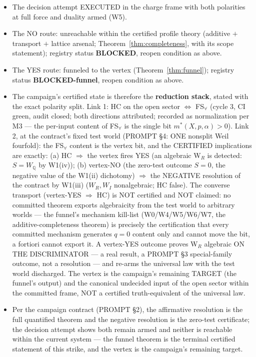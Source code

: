 \documentclass[11pt]{article}
\theoremstyle{definition}
\newcommand{\Q}{\mathbb{Q}}
\begin{document}
\begin{itemize}
\item The decision attempt EXECUTED in the charge frame with both polarities
at full force and duality armed (W5).
\item The NO route: unreachable within the certified profile theory
(additive $+$ transport $+$ lattice arsenal;
Theorem~\ref{thm:completeness}, with its scope statement); registry status
\textbf{BLOCKED}, reopen condition as above.
\item The YES route: funneled to the vertex (Theorem~\ref{thm:funnel}); registry
status \textbf{BLOCKED-funnel}, reopen condition as above.
\item The campaign's certified state is therefore the \textbf{reduction
stack}, stated with the exact polarity split. Link 1:
HC on the open sector $\iff$ FS$_\forall$ (cycle 3, CI green, audit
closed; both directions attributed; recorded as normalization per M3 ---
the per-input content of FS$_\forall$ is the single bit
$m^*(X,p,\alpha) > 0$). Link 2, at the contract's fixed test world
(PROMPT \S4: ONE nonsplit Weil fourfold): the FS$_\forall$ content is the
vertex bit, and the CERTIFIED implications are exactly:
(a) HC $\Rightarrow$ the vertex fires YES (an algebraic W$_R$ is
detected: $S = W_\Q$ by W1(iv));
(b) vertex-NO (the zero-test outcome $S = 0$, the negative value of the
W1(ii) dichotomy) $\Rightarrow$ the NEGATIVE
resolution of the contract by W1(iii) ($W_R, W_I$ nonalgebraic; HC false).
The converse transport (vertex-YES $\Rightarrow$ HC) is NOT certified
and NOT claimed: no committed theorem exports algebraicity from the
test world to arbitrary worlds --- the funnel's mechanism kill-list
(W0/W4/W5/W6/W7, the additive-completeness theorem) is precisely the
certification that every committed mechanism generates $q=0$ content
only and cannot move the bit, a fortiori cannot export it. A vertex-YES
outcome proves W$_R$ algebraic ON THE DISCRIMINATOR --- a real result,
a PROMPT \S3 special-family outcome, not a resolution --- and re-arms
the universal law with the test world discharged. The vertex is the
campaign's remaining TARGET (the funnel's output) and the canonical
undecided input of the open sector within the committed frame, NOT a
certified truth-equivalent of the universal law.
\item Per the campaign contract (PROMPT \S2), the affirmative resolution is
the full quantified theorem and the negative resolution is the zero-test
certificate; the decision attempt shows both remain armed and neither is
reachable within the current system --- the funnel theorem is the terminal
certified statement of this strike, and the vertex is the campaign's
remaining target.
\end{itemize}
\end{document}

